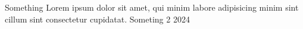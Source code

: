 


\begin{cvhonors}
  
\cvhonor
  {Something}
  {Lorem ipsum dolor sit amet, qui minim labore adipisicing minim sint cillum sint consectetur cupidatat.}
  {Someting 2}
  {2024}
  
\end{cvhonors}

